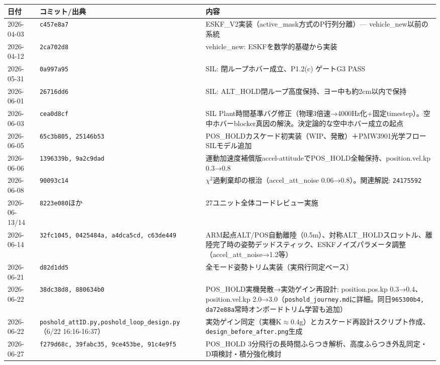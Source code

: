\documentclass[a4paper,10pt]{ltjsarticle}
\begin{document}
\begin{longtable}{@{}p{2.0cm}p{3.3cm}p{9.9cm}@{}}
\toprule
日付 & コミット/出典 & 内容 \\
\midrule
\endhead
2026-04-03 & \texttt{c457e8a7} & ESKF\_V2実装（active\_mask方式のP行列分離）--- vehicle\_new以前の系統 \\
2026-04-12 & \texttt{2ca702d8} & vehicle\_new: ESKFを数学的基礎から実装 \\
2026-05-31 & \texttt{0a997a95} & SIL: 閉ループホバー成立、P1.2(c) ゲートG3 PASS \\
2026-06-01 & \texttt{26716dd6} & SIL: ALT\_HOLD閉ループ高度保持、ヨー中も約2cm以内で保持 \\
2026-06-03 & \texttt{cea0d8cf} & SIL Plant時間基準バグ修正（物理3倍速→4000Hz化+固定timestep）。空中ホバーblocker真因の解決。決定論的な空中ホバー成立の起点 \\
2026-06-05 & \texttt{65c3b805, 25146b53} & POS\_HOLDカスケード初実装（WIP、発散）＋PMW3901光学フローSILモデル追加 \\
2026-06-06 & \texttt{1396339b, 9a2c9dad} & 運動加速度補償版accel-attitudeでPOS\_HOLD全軸保持、position.vel.kp 0.3→0.8 \\
2026-06-08 & \texttt{90093c14} & $\chi^2$過剰棄却の根治（accel\_att\_noise 0.06→0.8）。関連解説: \texttt{24175592} \\
2026-06-13/14 & \texttt{8223e080}ほか & 27ユニット全体コードレビュー実施 \\
2026-06-14 & \texttt{32fc1045, 0425484a, a4dca5cd, c63de449} & ARM起点ALT/POS自動離陸（0.5m）、対称ALT\_HOLDスロットル、離陸完了時の姿勢デッドスティック、ESKFノイズパラメータ調整（accel\_att\_noise→1.2等） \\
2026-06-21 & \texttt{d82d1dd5} & 全モード姿勢トリム実装（実飛行同定ベース） \\
2026-06-22 & \texttt{38dc38d8, 880634b0} & POS\_HOLD実機発散→実効ゲイン再設計: position.pos.kp 0.3→0.4、position.vel.kp 2.0→3.0（\texttt{poshold\_journey.md}に詳細。同日\texttt{965300b4, da72e88a}常時オンボードトリム学習も追加） \\
2026-06-22 & \texttt{poshold\_\allowbreak attID.py,}\newline\texttt{poshold\_\allowbreak loop\_\allowbreak design.py}（6/22 16:16-16:37） & 実効ゲイン同定（実機K$\approx$0.4g）とカスケード再設計スクリプト作成、\texttt{design\_before\_after.png}生成 \\
2026-06-27 & \texttt{f279d68c, 39fabc35, 9ce453be, 91c4e9f5} & POS\_HOLD 3分飛行の長時間ふらつき解析、高度ふらつき外乱同定・D項検討・積分強化検討 \\

\end{longtable}
\end{document}
